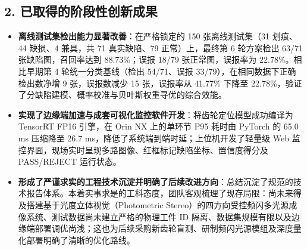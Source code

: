 \subsection*{2. 已取得的阶段性创新成果}
\begin{itemize}
    \item \textbf{离线测试集检出能力显著改善}：在严格锁定的 150 张离线测试集（31 划痕、44 缺损、4 兼具，共 71 真实缺陷、79 正常）上，最终第 6 轮方案检出 63/71 张缺陷图，召回率达到 88.73\%；误报 18/79 张正常图，误报率为 22.78\%。相比早期第 4 轮统一分类基线（检出 54/71、误报 33/79），在相同数据下正确检出数净增 9 张，误报数减少 15 张，误报率从 41.77\% 下降至 22.78\%，验证了分缺陷建模、概率校准与贝叶斯权重寻优的综合效能。
    \item \textbf{实现了边缘端加速与成套可视化监控软件开发}：将齿轮定位模型成功编译为 TensorRT FP16 引擎，在 Orin NX 上的单环节 P95 耗时由 PyTorch 的 65.0 ms 压缩降至 26.7 ms，降低了系统端到端时延；上位机开发了轻量级 Web 监控界面，现场实时呈现多路图像、红框标记缺陷坐标、置信度得分及 PASS/REJECT 运行状态。
    \item \textbf{形成了严谨求实的工程技术沉淀并明确了后续改进方向}：总结沉淀了规范的技术报告体系。本着实事求是的工科态度，团队客观梳理了现存局限：尚未来得及搭建基于光度立体视觉（Photometric Stereo）的四方向受控频闪多光源成像系统、测试数据尚未建立严格的物理工件 ID 隔离、数据集规模有限以及边缘端部署调优尚浅；这也为后续采购新齿轮盲测、研制频闪光源模组及深度量化部署明确了清晰的优化路线。
\end{itemize}
